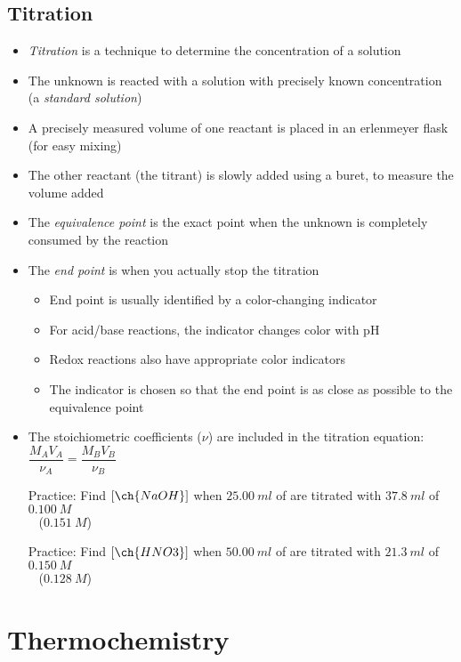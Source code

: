 \documentclass[12pt, openany, letterpaper]{memoir}
\begin{document}
\section{Titration}
\begin{itemize}
	\item \emph{Titration} is a technique to determine the concentration of a solution
	\item The unknown is reacted with a solution with precisely known concentration (a \emph{standard solution})
	\item A precisely measured volume of one reactant is placed in an erlenmeyer flask (for easy mixing)
	\item The other reactant (the titrant) is slowly added using a buret, to measure the volume added
	\item The \emph{equivalence point} is the exact point when the unknown is completely consumed by the reaction
	\item The \emph{end point} is when you actually stop the titration
	\begin{itemize}
		\item End point is usually identified by a color-changing indicator
		\item For acid/base reactions, the indicator changes color with pH
		\item Redox reactions also have appropriate color indicators
		\item The indicator is chosen so that the end point is as close as possible to the equivalence point
	\end{itemize}
	\item The stoichiometric coefficients ($\nu$) are included in the titration equation: $\dfrac{M_AV_A}{\nu_A}=\dfrac{M_BV_B}{\nu_B}$
	
	Practice: Find $\left[\ch{NaOH}\right]$ when $25.00~ml$ of  are titrated with $37.8~ml$ of $0.100~M$ \\
	~\hphantom{Practice: } ($0.151~M$)
	
	Practice: Find $\left[\ch{HNO3}\right]$ when $50.00~ml$ of  are titrated with $21.3~ml$ of $0.150~M$ \\
	~\hphantom{Practice: } ($0.128~M$)
\end{itemize}

\chapter{Thermochemistry}
\end{document}
